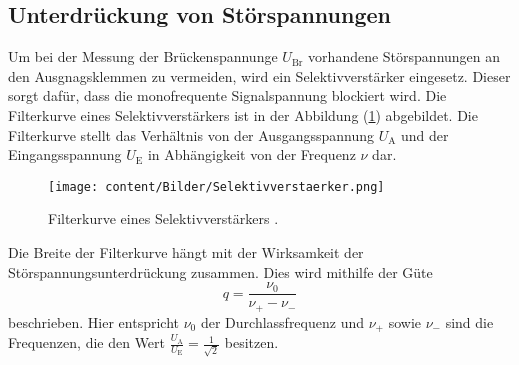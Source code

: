 \subsection{Unterdrückung von Störspannungen}
Um bei der Messung der Brückenspannunge $U_{\text{Br}}$ vorhandene Störspannungen an den Ausgnagsklemmen zu vermeiden, 
wird ein Selektivverstärker eingesetz. Dieser sorgt dafür, dass die monofrequente Signalspannung blockiert wird. Die Filterkurve 
eines Selektivverstärkers ist in der Abbildung (\ref{fig:Selektivverstaerker}) abgebildet. Die Filterkurve stellt das Verhältnis von 
der Ausgangsspannung $U_{\text{A}}$ und der Eingangsspannung $U_{\text{E}}$ in Abhängigkeit von der Frequenz $\nu$ dar.
\begin{figure}[H]
    \centering
    \texttt{[image: content/Bilder/Selektivverstaerker.png]}
    \caption{Filterkurve eines Selektivverstärkers \cite{anleitungV606}.}
    \label{fig:Selektivverstaerker}
\end{figure} 
Die Breite der Filterkurve hängt mit der Wirksamkeit der Störspannungsunterdrückung zusammen.
Dies wird mithilfe der Güte 
\begin{equation}
    q = \frac{\nu _0}{\nu _{+}- \nu _{-}}
    \label{eqn:Guete}
\end{equation}
beschrieben. Hier entspricht $\nu_0$ der Durchlassfrequenz und $\nu _{+}$ sowie $\nu _{-}$ sind die Frequenzen, die den Wert $\frac{U_{\text{A}}}{U_{\text{E}}} = \frac{1}{\sqrt{2}}$ besitzen. 
